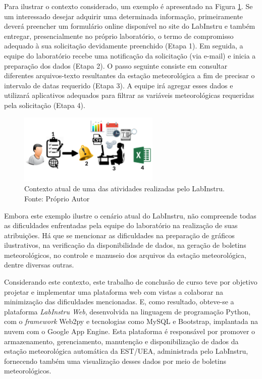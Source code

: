 Para ilustrar o contexto considerado, um exemplo é apresentado na Figura \ref{fig:contexto}. Se um interessado desejar adquirir uma determinada informação, primeiramente deverá preencher um formulário online disponível no site do LabInstru e também entregar, presencialmente no próprio laboratório, o termo de compromisso adequado à sua solicitação devidamente preenchido (Etapa 1). Em seguida, a equipe do laboratório recebe uma notificação da solicitação (via e-mail) e inicia a preparação dos dados (Etapa 2). O passo seguinte consiste em consultar diferentes arquivos-texto resultantes da estação meteorológica a fim de precisar o intervalo de datas requerido (Etapa 3). A equipe irá agregar esses dados e utilizará aplicativos adequados para filtrar as variáveis meteorológicas requeridas pela solicitação (Etapa 4).

\begin{figure}[H]
	\centering
	\includegraphics[width=0.6\textwidth]{./img/contexto.png}
	\caption{Contexto atual de uma das atividades realizadas pelo LabInstru. Fonte: Próprio Autor} 			\label{fig:contexto}
\end{figure}

Embora este exemplo ilustre o cenário atual do LabInstru, não compreende todas as dificuldades enfrentadas pela equipe do laboratório na realização de suas atribuições. Há que se mencionar as dificuldades na preparação de gráficos ilustrativos, na verificação da disponibilidade de dados, na geração de boletins meteorológicos, no controle e manuseio dos arquivos da estação meteorológica, dentre diversas outras.

Considerando este contexto, este trabalho de conclusão de curso teve por objetivo projetar e implementar uma plataforma web com vistas a colaborar na minimização das dificuldades mencionadas. E, como resultado, obteve-se a plataforma \emph{LabInstru Web}, desenvolvida na linguagem de programação Python, com o \emph{framework} Web2py e tecnologias como MySQL e Bootstrap, implantada na nuvem com o Google App Engine.  Esta plataforma é responsável por promover o armazenamento, gerenciamento, manutenção e disponibilização de dados da estação meteorológica automática da EST/UEA, administrada pelo LabInstru, fornecendo também uma visualização desses dados por meio de boletins meteorológicos.

